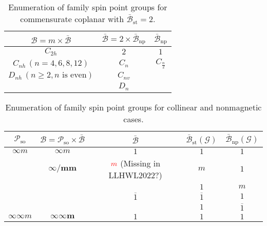 \begin{table}[tb]
  \centering
  \caption{
    \todo{}
    Enumeration of family spin point groups for commensurate coplanar with $\bar{\mathcal{B}}_{\mathrm{st}} = 2$.
  }
  \label{tab:spin_point_group_coplanar_st2}
  \begin{tabular}{ccc}
    \hline \hline
    $\mathcal{B} = m \times \bar{\mathcal{B}}$
        & $\bar{\mathcal{B}} = 2 \times \bar{\mathcal{B}}_{\mathrm{np}}$
        & $\bar{\mathcal{B}}_{\mathrm{np}}$
        \\
    \hline
    $C_{2h}$                                   & $2$      & $1$       \\
    $C_{nh} \, (n = 4, 6, 8, 12)$              & $C_{n}$  & $C_{\frac{n}{2}}$ \\
    $D_{nh} \, (n \geq 2, \mbox{$n$ is even})$ & $C_{nv}$ &       \\
                                               & $D_{n}$  &       \\
    \hline \hline
  \end{tabular}
\end{table}

\begin{table}[tb]
  \centering
  \caption{
    Enumeration of family spin point groups for collinear and nonmagnetic cases.
  }
  \label{tab:spin_point_group_collinear_nonmagnetic}
  \begin{tabular}{ccccc}
    \hline \hline
    $\mathcal{P}_{\mathrm{so}}$  %
        & $\mathcal{B} = \mathcal{P}_{\mathrm{so}} \times \bar{\mathcal{B}}$
        & $\bar{\mathcal{B}}$  %
        & $\bar{\mathcal{B}}_{\mathrm{st}}(\mathcal{G})$  %
        & $\bar{\mathcal{B}}_{\mathrm{np}}(\mathcal{G})$  %
        \\
    \hline
    $\infty m$ & $\infty m$              & $1$            & $1$            & $1$ \\
               & $\mathbf{\infty / m m}$ & $\textcolor{red}{m}$ (Missing in LLHWL2022?)& $m$            & $1$ \\
               &                         &                & $1$            & $m$ \\
               &                         & $\overline{1}$ & $\overline{1}$ & $1$ \\
               &                         &                & $1$            & $\overline{1}$ \\
    \hline
    $\infty \infty m$ & $\mathbf{\infty \infty m}$ & $1$ & $1$ & $1$ \\
    \hline \hline
  \end{tabular}
\end{table}
